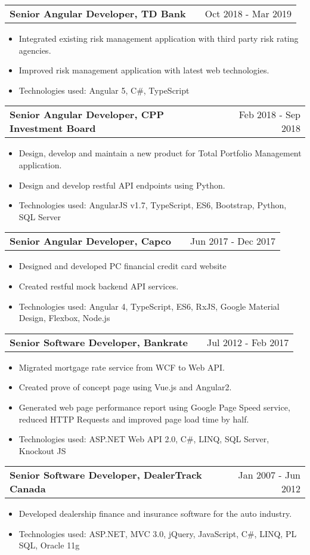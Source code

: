 \documentclass[a4paper,12pt]{article}
\makeatletter
\newenvironment{joblong}[2]
    {
    \begin{tabularx}{\linewidth}{@{}l X r@{}}
    \textbf{#1} & \hfill &  #2 \\[3.75pt]
    \end{tabularx}
    \begin{minipage}[t]{\linewidth}
    \begin{itemize}[nosep,after=\strut, leftmargin=1em, itemsep=3pt,label=--]
    }
    {
    \end{itemize}
    \end{minipage}    
    }
\makeatother
\begin{document}
\begin{joblong}{Senior Angular Developer, TD Bank}{Oct 2018 - Mar 2019}
\item Integrated existing risk management application with third party risk rating agencies.
\item Improved risk management application with latest web technologies.
\item Technologies used:  Angular 5, C\#, TypeScript
\end{joblong}

\begin{joblong}{Senior Angular Developer, CPP Investment Board}{Feb 2018 - Sep 2018}
\item Design, develop and maintain a new product for Total Portfolio Management application.
\item Design and develop restful API endpoints using Python. 
\item Technologies used: AngularJS v1.7, TypeScript, ES6, Bootstrap, Python, SQL Server
\end{joblong}

\begin{joblong}{Senior Angular Developer, Capco}{Jun 2017 - Dec 2017}
\item Designed and developed PC financial credit card website 
\item Created restful mock backend API services. 
\item Technologies used: Angular 4, TypeScript, ES6, RxJS, Google Material Design, Flexbox, Node.js
\end{joblong}

\begin{joblong}{Senior Software Developer, Bankrate}{Jul 2012 - Feb 2017}
\item Migrated mortgage rate service from WCF to Web API.
\item Created prove of concept page using Vue.js and Angular2. 
\item Generated web page performance report using Google Page Speed service, reduced HTTP Requests and improved page load time by half.
\item Technologies used: ASP.NET Web API 2.0, C\#, LINQ, SQL Server, Knockout JS
\end{joblong}

\begin{joblong}{Senior Software Developer, DealerTrack Canada}{Jan 2007 - Jun 2012}
\item Developed dealership finance and insurance software for the auto industry.
\item Technologies used: ASP.NET, MVC 3.0, jQuery, JavaScript, C\#, LINQ, PL SQL, Oracle 11g
\end{joblong}
\end{document}
